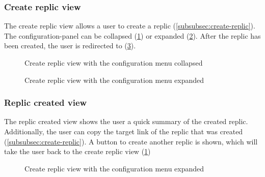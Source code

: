 \subsubsection{Create replic view}
The create replic view allows a user to create a replic (\ref{subsubsec:create-replic}).
The configuration-panel can be collapsed (\ref{fig:ex-create-replic-view-collapsed}) or expanded (\ref{fig:ex-create-replic-view-expanded}). \newline
After the replic has been created, the user is redirected to (\ref{fig:ex-created-replic-view}).
\begin{figure}
    \centering

    \caption{Create replic view with the configuration menu collapsed}
    \label{fig:ex-create-replic-view-collapsed}
\end{figure}
\begin{figure}
    \centering

    \caption{Create replic view with the configuration menu expanded}
    \label{fig:ex-create-replic-view-expanded}
\end{figure}

\subsubsection{Replic created view}
The replic created view shows the user a quick summary of the created replic.
Additionally, the user can copy the target link of the replic that was created (\ref{subsubsec:create-replic}). \newline
A button to create another replic is shown, which will take the user back to the create replic view (\ref{fig:ex-create-replic-view-collapsed})
\begin{figure}
    \centering

    \caption{Create replic view with the configuration menu expanded}
    \label{fig:ex-created-replic-view}
\end{figure}

